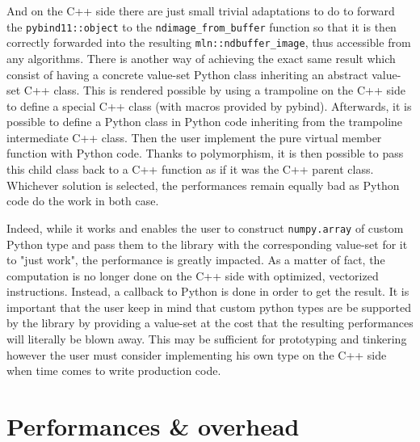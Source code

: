 And on the C++ side there are just small trivial adaptations to do to forward the \texttt{pybind11::object} to the
\texttt{ndimage\_from\_buffer} function so that it is then correctly forwarded into the resulting
\texttt{mln::ndbuffer\_image}, thus accessible from any algorithms. There is another way of achieving the exact same
result which consist of having a concrete value-set Python class inheriting an abstract value-set C++ class. This is
rendered possible by using a trampoline on the C++ side to define a special C++ class (with macros provided by pybind).
Afterwards, it is possible to define a Python class in Python code inheriting from the trampoline intermediate C++
class. Then the user implement the pure virtual member function with Python code. Thanks to polymorphism, it is then
possible to pass this child class back to a C++ function as if it was the C++ parent class. Whichever solution is
selected, the performances remain equally bad as Python code do the work in both case.

Indeed, while it works and enables the user to construct \texttt{numpy.array} of custom Python type and pass them to the
library with the corresponding value-set for it to "just work", the performance is greatly impacted. As a matter of
fact, the computation is no longer done on the C++ side with optimized, vectorized instructions. Instead, a callback to
Python is done in order to get the result. It is important that the user keep in mind that custom python types are be
supported by the library by providing a value-set at the cost that the resulting performances will literally be blown
away. This may be sufficient for prototyping and tinkering however the user must consider implementing his own type on
the C++ side when time comes to write production code.

\section{Performances \& overhead}


